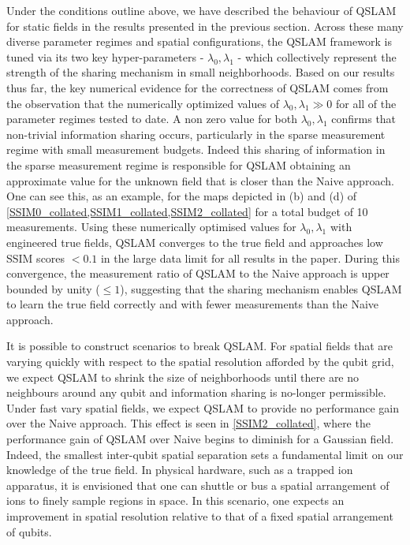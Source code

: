 Under the conditions outline above, we have described the behaviour of QSLAM for static fields in the results presented in the previous section. Across these many diverse parameter regimes and spatial configurations, the QSLAM framework is tuned via its two key hyper-parameters - $\lambda_0, \lambda_1$ - which collectively represent the strength of the sharing mechanism in small neighborhoods. Based on our results thus far, the key numerical evidence for the correctness of QSLAM comes from the observation that the numerically optimized values of $\lambda_0, \lambda_1 \gg 0 $ for all of the parameter regimes tested to date. A non zero value for both  $\lambda_0, \lambda_1$  confirms that non-trivial information sharing occurs, particularly in the sparse measurement regime with small measurement budgets. Indeed this sharing of information in the sparse measurement regime is responsible for QSLAM obtaining an approximate value for the unknown field that is closer than the Naive approach. One can see this, as  an example, for the maps depicted in (b) and (d) of \cref{SSIM0_collated,SSIM1_collated,SSIM2_collated} for a total budget of 10 measurements. Using these numerically optimised values for  $\lambda_0, \lambda_1$ with engineered true fields, QSLAM converges to the true field and approaches low SSIM scores $< 0.1$ in the large data limit for all results in the paper. During this convergence, the measurement ratio of QSLAM to the Naive approach is upper bounded by unity ($\leq 1$), suggesting that the sharing mechanism enables QSLAM to learn the true field correctly and with fewer measurements than the Naive approach. 

It is possible to construct scenarios to break QSLAM. For spatial fields that are varying quickly with respect to the spatial resolution afforded by the qubit grid, we expect QSLAM to shrink the size of neighborhoods until there are no neighbours around any qubit and information sharing is no-longer permissible. Under fast vary spatial fields, we expect QSLAM to provide no performance gain over the Naive approach. This effect is seen in \cref{SSIM2_collated}, where the performance gain of QSLAM over Naive begins to diminish for a Gaussian field. Indeed, the smallest inter-qubit spatial separation sets a fundamental limit on our knowledge of the true field. In physical hardware, such as a trapped ion apparatus, it is envisioned that one can shuttle or bus a spatial arrangement of ions to finely sample regions in space. In this scenario, one expects an improvement in spatial resolution relative to that of a fixed spatial arrangement of qubits.

